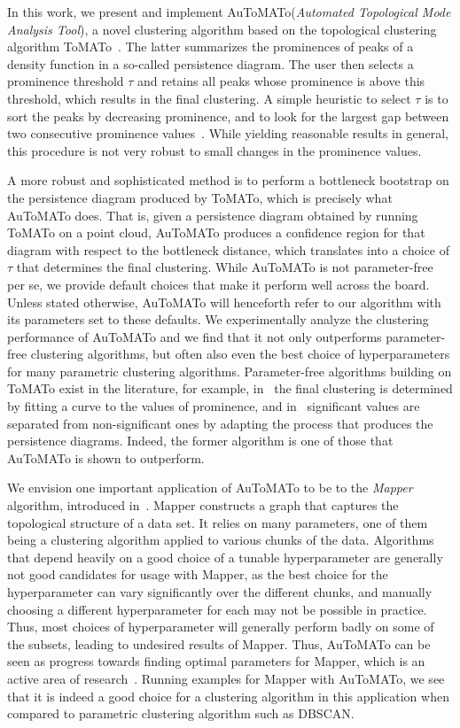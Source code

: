 \documentclass[10pt]{article} %
\theoremstyle{plain}
\newcommand{\aut}{AuToMATo\xspace}
\newcommand{\tom}{ToMATo\xspace}
\begin{document}
In this work, we present and implement \aut (\emph{Automated Topological Mode Analysis Tool}), a novel clustering algorithm based on the topological clustering algorithm ToMATo~\citep{chazal2013persistence}. The latter summarizes the prominences of peaks of a density function in a so-called persistence diagram. The user then selects a prominence threshold \(\tau\) and retains all peaks whose prominence is above this threshold, which results in the final clustering.
A simple heuristic to select \(\tau\) is to sort the peaks by decreasing prominence, and to look for the largest gap between two consecutive prominence values~\citep{chazal2013persistence}. While yielding reasonable results in general, this procedure is not very robust to small changes in the prominence values.

A more robust and sophisticated method is to perform a bottleneck bootstrap on the persistence diagram produced by \tom, which is precisely what \aut does. That is, given a persistence diagram obtained by running \tom on a point cloud, \aut produces a confidence region for that diagram with respect to the bottleneck distance, which translates into a choice of \(\tau\) that determines the final clustering. While \aut is not parameter-free per se, we provide default choices that make it perform well across the board. Unless stated otherwise, \aut will henceforth refer to our algorithm with its parameters set to these defaults.
We experimentally analyze the clustering performance of \aut and we find that it not only outperforms parameter-free clustering algorithms, but often also even the best choice of hyperparameters for many parametric clustering algorithms.
Parameter-free algorithms building on \tom exist in the literature, for example, in~\citet{cotsakis2021implementing} the final clustering is determined by fitting a curve to the values of prominence, and in~\citet{outlier} significant values are separated from non-significant ones by adapting the process that produces the persistence diagrams.
Indeed, the former algorithm is one of those that \aut is shown to outperform.

We envision one important application of \aut to be to the \emph{Mapper} algorithm, introduced in~\citet{singh2007topological}. Mapper constructs a graph that captures the topological structure of a data set. It relies on many parameters, one of them being a clustering algorithm applied to various chunks of the data. Algorithms that depend heavily on a good choice of a tunable hyperparameter are generally not good candidates for usage with Mapper, as the best choice for the hyperparameter can vary significantly over the different chunks, and manually choosing a different hyperparameter for each may not be possible in practice. Thus, most choices of hyperparameter will generally perform badly on some of the subsets, leading to undesired results of Mapper. Thus, \aut can be seen as progress towards finding optimal parameters for Mapper, which is an active area of research~\citep{mapper_parameter_selection_carriere, mapper_parameter_selection_wang, mapper_parameter_selection_wang_2}.
Running examples for Mapper with \aut, we see that it is indeed a good choice for a clustering algorithm in this application when compared to parametric clustering algorithm such as DBSCAN.
\end{document}
